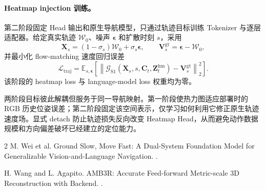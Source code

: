 \documentclass[10pt]{ctexart}
\begin{document}
\paragraph{Heatmap injection 训练。}
第二阶段固定 Head 输出和原生导航模型，只通过轨迹目标训练 Tokenizer 与逐层适配器。给定真实轨迹 $\mathcal{W}_0$、噪声 $\bm{\epsilon}$ 和扩散时刻 $s$，采用
\begin{equation}
  \mathbf{X}_{s}
  =(1-\sigma_s)\mathcal{W}_0+\sigma_s\bm{\epsilon},
  \qquad
  \mathbf{V}_{s}^{\mathrm{gt}}
  =\bm{\epsilon}-\mathcal{W}_0,
\end{equation}
并最小化 flow-matching 速度回归误差
\begin{equation}
  \mathcal{L}_{\mathrm{traj}}
  =\mathbb{E}_{s,\bm{\epsilon}}
   \left[
   \left\|
   \mathcal{G}_{\mathrm{S1}}
   (\mathbf{X}_s,s,\mathbf{C}_t,
    \mathbf{Z}^{\mathrm{hm}}_t)
   -\mathbf{V}_{s}^{\mathrm{gt}}
   \right\|_2^2
   \right].
\end{equation}
该阶段的 heatmap loss 与 language-model loss 权重均为零。

两阶段目标彼此解耦但服务于同一导航映射。第一阶段使热力图适应部署时的 RGB 历史位姿误差；第二阶段固定该空间表示，仅学习如何利用它修正原生轨迹速度场。显式 detach 防止轨迹损失反向改变 Heatmap Head，从而避免动作数据规模和方向偏差破坏已经建立的定位能力。

\begin{thebibliography}{2}
M. Wei et al.
\newblock Ground Slow, Move Fast: A Dual-System Foundation Model for Generalizable Vision-and-Language Navigation.
.

H. Wang and L. Agapito.
\newblock AMB3R: Accurate Feed-forward Metric-scale 3D Reconstruction with Backend.
.
\end{thebibliography}
\end{document}
